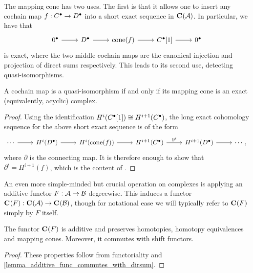 The mapping cone has two uses.
The first is that it allows one to insert any cochain map $f:
{{C}}^{\bullet} \to {{D}}^{\bullet}$ into a short exact sequence in
${\mathbf{C}}^{{}}({\mathcal{A}})$.
In particular, we have that
\[
  \begin{tikzcd}
    \cochaincomp{0} \arrow[r]
    & \cochaincomp{D} \arrow[r]
    & \cone{f} \arrow[r]
    & \cochaincomp{C}[1] \arrow[r]
    & \cochaincomp{0}
  \end{tikzcd}
\]
is exact, where the two middle cochain maps are the canonical
injection and projection of direct sums respectively.
This leads to its second use, detecting quasi-isomorphisms.

\begin{corollary}
  \label{cor_quasi_isom_has_acyclic_cone}
  A cochain map is a quasi-isomorphism if and only if its mapping
  cone is an exact (equivalently, acyclic) complex.
\end{corollary}

\begin{proof}
  Using the identification $H^i({{C}}^{\bullet}[1]) \cong H^{i +
  1}({{C}}^{\bullet})$, the long exact cohomology sequence for the
  above short exact sequence is of the form
  \[
    \begin{tikzcd}
      \cdots \arrow[r]
      & H^i(\cochaincomp{D}) \arrow[r]
      & H^i(\cone{f}) \arrow[r]
      & H^{i + 1}(\cochaincomp{C}) \arrow[r, "\partial^i"]
      & H^{i + 1}(\cochaincomp{D}) \arrow[r]
      & \cdots,
    \end{tikzcd}
  \]
  where $\partial$ is the connecting map.
  It is therefore enough to show that $\partial^i = H^{i + 1}(f)$,
  which is the content of \cite[Lemma~1.5.3]{weibel}.
\end{proof}

An even more simple-minded but crucial operation on complexes is
applying an additive functor $F: \mathcal{A} \to \mathcal{B}$ degreewise.
This induces a functor ${\mathbf{C}}^{{}}({F}): {\mathbf{C}}^{{}}({\mathcal{A}}) \to {\mathbf{C}}^{{}}({\mathcal{B}})$,
though for notational ease we will typically refer to ${\mathbf{C}}^{{}}({F})$ simply
by $F$ itself.

\begin{lemma}
  \label{lemma_add_func_preserves_homotopy_and_cones}
  The functor ${\mathbf{C}}^{{}}({F})$ is additive and preserves homotopies, homotopy
  equivalences and mapping cones.
  Moreover, it commutes with shift functors.
\end{lemma}

\begin{proof}
  These properties follow from functoriality and
  \cref{lemma_additive_func_commutes_with_dirsum}.
\end{proof}


